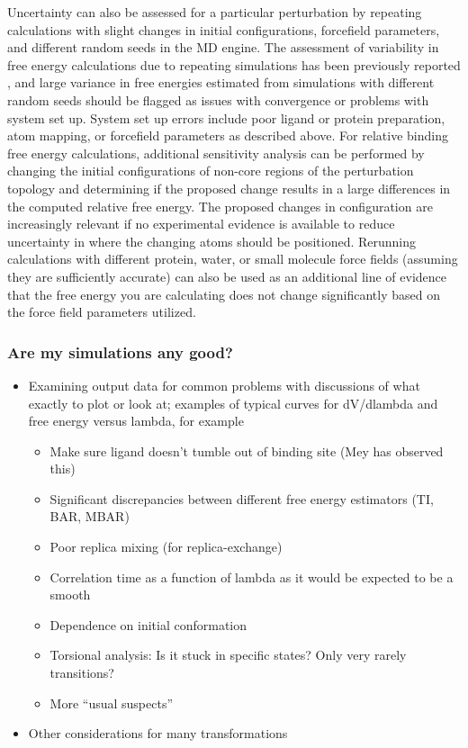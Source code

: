 \documentclass[9pt,bestpractices]{livecoms}
\begin{document}
\begin{enumerate}
Uncertainty can also be assessed for a particular perturbation by repeating calculations with slight changes in initial configurations, forcefield parameters, and different random seeds in the MD engine. 
The assessment of variability in free energy calculations due to repeating simulations has been previously reported \cite{aldeghi2019accurate}, and large variance in free energies estimated from simulations with different random seeds should be flagged as issues with convergence or problems with system set up. 
System set up errors include poor ligand or protein preparation, atom mapping, or forcefield parameters as described above.
For relative binding free energy calculations, additional sensitivity analysis can be performed by changing the initial configurations of non-core regions of the perturbation topology and determining if the proposed change results in a large differences in the computed relative free energy.
The proposed changes in configuration are increasingly relevant if no experimental evidence is available to reduce uncertainty in where the changing atoms should be positioned.
Rerunning calculations with different protein, water, or small molecule force fields (assuming they are sufficiently accurate) can also be used as an additional line of evidence that the free energy you are calculating does not change significantly based on the force field parameters utilized.


\subsubsection{Are my simulations any good?}

\begin{itemize}
\item Examining output data for common problems with discussions of what exactly to plot or look at; examples of typical curves for dV/dlambda and free energy versus lambda, for example
\begin{itemize}
\item Make sure ligand doesn’t tumble out of binding site (Mey has observed this)
\item Significant discrepancies between different free energy estimators (TI, BAR, MBAR)
\item Poor replica mixing (for replica-exchange)
\item Correlation time as a function of lambda as it would be expected to be a smooth
\item Dependence on initial conformation
\item Torsional analysis: Is it stuck in specific states? Only very rarely transitions?
\item More “usual suspects”
\end{itemize}
\item Other considerations for many transformations
\end{itemize}


\end{enumerate}
\end{document}
